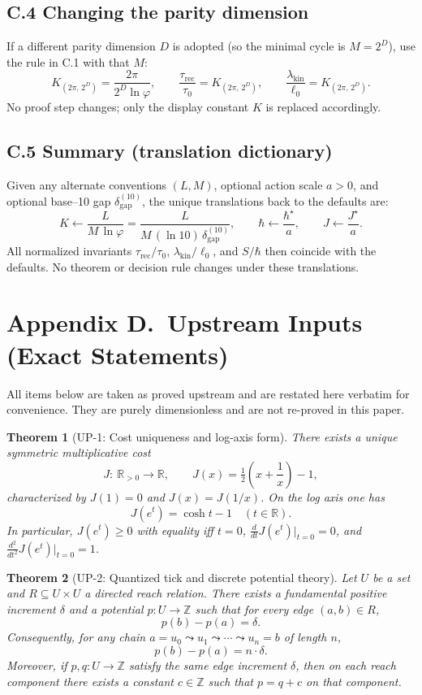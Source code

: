 \documentclass[11pt]{article}
\theoremstyle{plain}
\newtheorem{theorem}{Theorem}
\theoremstyle{definition}
\theoremstyle{remark}
\begin{document}
\subsection*{C.4 Changing the parity dimension}
If a different parity dimension \(D\) is adopted (so the minimal cycle is \(M=2^{D}\)), use the rule in C.1 with that \(M\):
\[
K_{(2\pi,\,2^{D})}=\frac{2\pi}{2^{D}\ln\varphi},\qquad
\frac{\tau_{\mathrm{rec}}}{\tau_{0}}=K_{(2\pi,\,2^{D})},\qquad
\frac{\lambda_{\mathrm{kin}}}{\ell_{0}}=K_{(2\pi,\,2^{D})}.
\]
No proof step changes; only the display constant \(K\) is replaced accordingly.

\subsection*{C.5 Summary (translation dictionary)}
Given any alternate conventions \((L,M)\), optional action scale \(a>0\), and optional base–10 gap \(\delta_{\mathrm{gap}}^{(10)}\), the unique translations back to the defaults are:
\[
K\leftarrow \frac{L}{M\,\ln\varphi}
=\frac{L}{M\,(\ln 10)\,\delta_{\mathrm{gap}}^{(10)}},\qquad
\hbar\leftarrow \frac{\hbar^{\star}}{a},\qquad
J\leftarrow \frac{J^{\star}}{a}.
\]
All normalized invariants \(\tau_{\mathrm{rec}}/\tau_{0}\), \(\lambda_{\mathrm{kin}}/\ell_{0}\), and \(S/\hbar\) then coincide with the defaults. No theorem or decision rule changes under these translations.

\section*{Appendix D.\ Upstream Inputs (Exact Statements)}

All items below are taken as proved upstream and are restated here verbatim for convenience. They are purely dimensionless and are not re-proved in this paper.

\begin{theorem}[UP-1: Cost uniqueness and log-axis form]
There exists a unique symmetric multiplicative cost
\[
J:\ \mathbb{R}_{>0}\to\mathbb{R},\qquad
J(x)=\tfrac12\!\left(x+\frac{1}{x}\right)-1,
\]
characterized by \(J(1)=0\) and \(J(x)=J(1/x)\). On the log axis one has
\[
J(e^{t})=\cosh t-1\quad(t\in\mathbb{R}).
\]
In particular, \(J(e^{t})\ge 0\) with equality iff \(t=0\), \(\frac{d}{dt}J(e^{t})\big|_{t=0}=0\), and \(\frac{d^{2}}{dt^{2}}J(e^{t})\big|_{t=0}=1\).
\end{theorem}

\begin{theorem}[UP-2: Quantized tick and discrete potential theory]
Let \(U\) be a set and \(R\subseteq U\times U\) a directed reach relation. There exists a fundamental positive increment \(\delta\) and a potential \(p:U\to\mathbb{Z}\) such that for every edge \((a,b)\in R\),
\[
p(b)-p(a)=\delta.
\]
Consequently, for any chain \(a=u_{0}\leadsto u_{1}\leadsto\cdots\leadsto u_{n}=b\) of length \(n\),
\[
p(b)-p(a)=n\cdot\delta.
\]
Moreover, if \(p,q:U\to\mathbb{Z}\) satisfy the same edge increment \(\delta\), then on each reach component there exists a constant \(c\in\mathbb{Z}\) such that \(p=q+c\) on that component.
\end{theorem}
\end{document}

